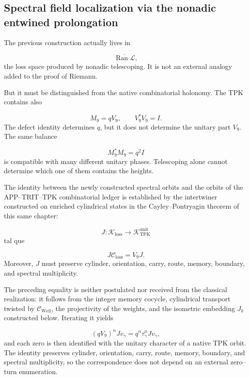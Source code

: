\subsection{Spectral field localization via the nonadic entwined prolongation}
The previous construction actually lives in\par
\[
\overline{\operatorname{Ran}\mathscr L},
\]
the loss space produced by nonadic telescoping. It is not an external analogy added to the proof of Riemann.\par
But it must be distinguished from the native combinatorial holonomy. The TPK contains also\par
\[
M_9=qV_9,
\qquad
V_9^*V_9=I.
\]
The defect identity determines \(q\), but it does not determine the unitary part \(V_9\). The same balance\par
\[
M_9^*M_9=q^2I
\]
is compatible with many different unitary phases. Telescoping alone cannot determine which one of them contains the heights.\par
The identity between the newly constructed spectral orbits and the orbits of the APP–TRIT–TPK combinatorial ledger is established by the intertwiner constructed on enriched cylindrical states in the Cayley--Pontryagin theorem of this same chapter:\par
\[
J:
\mathcal K_{\mathrm{loss}}
\longrightarrow
\mathcal K_{\mathrm{TPK}}^{\mathrm{unit}}
\]
tal que\par
\[
\boxed{
J\mathcal C_{\mathrm{loss}}
=
V_9J.
}
\]
Moreover, \(J\) must preserve cylinder, orientation, carry, route, memory, boundary, and spectral multiplicity.\par
The preceding equality is neither postulated nor received from the classical realization: it follows from the integer memory cocycle, cylindrical transport twisted by \(\mathcal C_{\mathrm{Weil}}\), the projectivity of the weights, and the isometric embedding \(J_k\) constructed below. Iterating it yields\par
\[
(qV_9)^nJv_\gamma
=
q^n\tau_\gamma^nJv_\gamma,
\]
and each zero is then identified with the unitary character of a native TPK orbit. The identity preserves cylinder, orientation, carry, route, memory, boundary, and spectral multiplicity, so the correspondence does not depend on an external zero--turn enumeration.\par
{}
